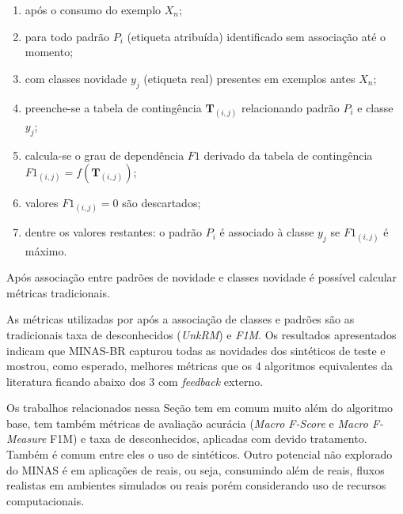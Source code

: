 \begin{enumerate}

    \item após o consumo do exemplo $X_n$;
    
    \item para todo padrão $P_i$ (etiqueta atribuída) identificado sem
    associação até o momento;
    
    \item com classes novidade $y_j$ (etiqueta real) presentes em exemplos antes
    $X_n$;
    
    \item preenche-se a tabela de contingência $\mathbf{T}_{(i,j)}$ relacionando
    padrão $P_i$ e classe $y_j$;
    
    \item calcula-se o grau de dependência $\mathit{F1}$ derivado da tabela de
    contingência $\mathit{F1}_{(i,j)} = f(\mathbf{T}_{(i,j)})$;
    
    \item valores $\mathit{F1}_{(i,j)} = 0$ são descartados;
    
    \item dentre os valores restantes: o padrão $P_i$ é associado à classe $y_j$
    se $\mathit{F1}_{(i,j)}$ é máximo.

\end{enumerate}

Após associação entre padrões de novidade e classes novidade é possível calcular
métricas tradicionais.

As métricas utilizadas por  após a associação de classes e
padrões são as tradicionais taxa de desconhecidos (\emph{UnkRM}) e \emph{F1M}.
Os resultados apresentados indicam que MINAS-BR capturou todas as novidades dos
\datasets sintéticos de teste e mostrou, como esperado, melhores métricas que os
4 algoritmos equivalentes da literatura ficando abaixo dos 3 com \emph{feedback}
externo.


Os trabalhos relacionados nessa Seção tem em comum muito além do algoritmo base,
tem também métricas de avaliação acurácia (\emph{Macro F-Score} e \emph{Macro
F-Measure} F1M) e taxa de desconhecidos, aplicadas com devido tratamento.
Também é comum entre eles o uso de \datasets sintéticos.
Outro potencial não explorado do MINAS é em aplicações de reais, ou seja,
consumindo além de \datasets reais, fluxos realistas em ambientes simulados ou
reais porém considerando uso de recursos computacionais.

